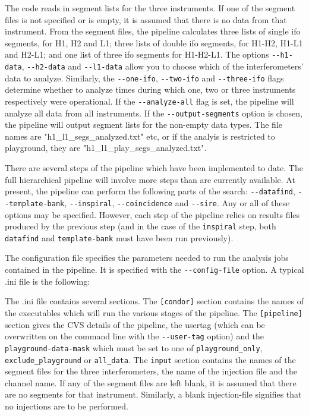 \begin{entry}
The code reads in segment lists for the three instruments.  If one of the
segment files is not specified or is empty, it is assumed that there is no data
from that instrument.  From the segment files, the pipeline calculates three
lists of single ifo segments, for H1, H2 and L1; three lists of double ifo
segments, for H1-H2, H1-L1 and H2-L1; and one list of three ifo segments for
H1-H2-L1.  The options \verb$--h1-data$, \verb$--h2-data$ and \verb$--l1-data$
allow you to choose which of the interferometers' data to analyze.  Similarly,
the \verb$--one-ifo$, \verb$--two-ifo$ and \verb$--three-ifo$ flags determine
whether to analyze times during which one, two or three instruments
respectively were operational.  If the \verb$--analyze-all$ flag is set, the
pipeline will analyze all data from all instruments.  If the
\verb$--output-segments$ option is chosen, the pipeline will output segment
lists for the non-empty data types.  The file names are
"h1\_l1\_segs\_analyzed.txt" etc, or if the analyis is restricted to
playground, they are "h1\_l1\_play\_segs\_analyzed.txt".

There are several steps of the pipeline which have been implemented to date.
The full hierarchical pipeline will involve more steps than are currently
available.  At present, the pipeline can perform the following parts of the
search: \verb$--datafind$, \verb$--template-bank$, \verb$--inspiral$,
\verb$--coincidence$ and \verb$--sire$.  Any or all of these options may be
specified.  However, each step of the pipeline relies on results files
produced by the previous step (and in the case of the \verb$inspiral$ step,
both \verb$datafind$ and \verb$template-bank$ must have been run previously).


The configuration file specifies the parameters needed to run the analysis jobs
contained in the pipeline.  It is specified with the \verb$--config-file$
option.  A typical .ini file is the following: 

  

The .ini file contains several sections.  The \verb$[condor]$ section contains
the names of the executables which will run the various stages of the
pipeline.  The \verb$[pipeline]$ section gives the CVS details of the
pipeline, the usertag (which can be overwritten on the command line with the
\verb$--user-tag$ option) and the \verb$playground-data-mask$ which must be
set to one of \verb$playground_only$, \verb$exclude_playground$ or
\verb$all_data$.  The \verb$input$ section contains the names of the segment
files for the three interferometers, the name of the injection file and the
channel name.  If any of the segment files are left blank, it is assumed that
there are no segments for  that instrument.  Similarly,  a blank
injection-file signifies that no injections are to be performed.


\end{entry}
